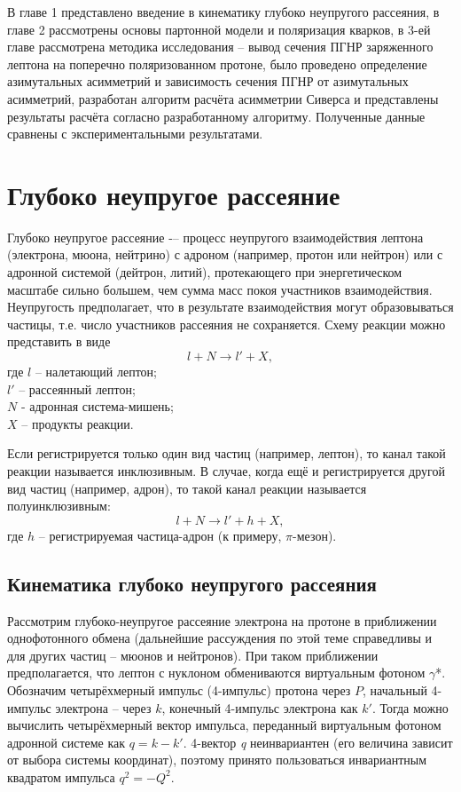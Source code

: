 \documentclass{extreport}
\begin{document}
В главе 1 представлено введение в кинематику глубоко неупругого рассеяния, в главе 2 рассмотрены основы партонной модели и поляризация кварков, в 3-ей главе рассмотрена методика исследования -- вывод сечения ПГНР заряженного лептона на поперечно поляризованном протоне, было проведено определение азимутальных асимметрий и зависимость сечения ПГНР от азимутальных асимметрий, разработан алгоритм расчёта асимметрии Сиверса и представлены результаты расчёта согласно разработанному алгоритму. Полученные данные сравнены с экспериментальными результатами.

\newpage
\chapter{Глубоко неупругое рассеяние}
Глубоко неупругое рассеяние -– процесс неупругого взаимодействия лептона (электрона, мюона, нейтрино) с адроном (например, протон или нейтрон) или с адронной системой (дейтрон, литий), протекающего при энергетическом масштабе сильно большем, чем сумма масс покоя участников взаимодействия. Неупругость предполагает, что в результате взаимодействия могут образовываться частицы, т.е. число участников рассеяния не сохраняется. Схему реакции можно представить в виде
\begin{equation}
	l + N \rightarrow l' + X,
\end{equation}
где $l$ -- налетающий лептон; \\ $l'$ -- рассеянный лептон; \\ $N$ - адронная система-мишень; \\ $X$ -- продукты реакции. 

Если регистрируется только один вид частиц (например, лептон), то канал такой реакции называется инклюзивным. В случае, когда ещё и регистрируется другой вид частиц (например, адрон), то такой канал реакции называется полуинклюзивным:
\begin{equation}
	l + N \rightarrow l' + h + X,
\end{equation}
где $h$ -- регистрируемая частица-адрон (к примеру, $\pi$-мезон). 
\section{Кинематика глубоко неупругого рассеяния}
Рассмотрим глубоко-неупругое рассеяние электрона на протоне в приближении однофотонного обмена (дальнейшие рассуждения по этой теме справедливы и для других частиц – мюонов и нейтронов). При таком приближении предполагается, что лептон с нуклоном обмениваются виртуальным фотоном $\gamma$*. Обозначим четырёхмерный импульс (4-импульс) протона через $P$, начальный 4-импульс электрона – через $k$,  конечный 4-импульс электрона как $k'$. Тогда можно вычислить четырёхмерный вектор импульса, переданный виртуальным фотоном адронной системе как $q=k-k'$. 4-вектор \textit{q} неинвариантен (его величина зависит от выбора системы координат), поэтому принято пользоваться инвариантным квадратом импульса $q^2=-Q^2$.
\end{document}
